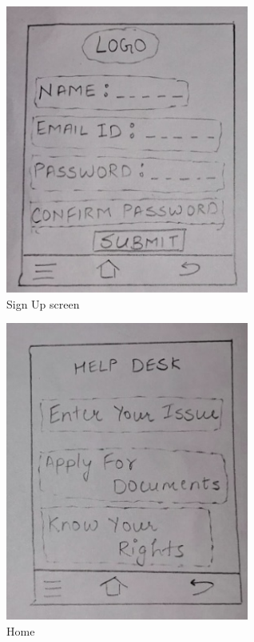 \documentclass[acmtog]{acmart}
\begin{document}
\begin{figure}[H]
    \includegraphics[width=8cm]{Resources/SignUp.jpg}
    \caption{Sign Up screen}
    \label{fig:signup}
\end{figure}
\begin{figure}[H]
    \includegraphics[width=8cm]{Resources/Home.jpg}
    \caption{Home}
    \label{fig:home}
\end{figure}
\end{document}
